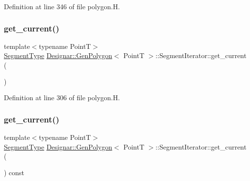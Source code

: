 Definition at line 346 of file polygon.\+H.

\mbox{\label{class_designar_1_1_gen_polygon_1_1_segment_iterator_ac70a85f86d2ff0b55b3bfe1a495afcc3}} 
\subsubsection{\texorpdfstring{get\+\_\+current()}{get\_current()}\hspace{0.1cm}{\footnotesize\ttfamily [1/2]}}
{\footnotesize\ttfamily template$<$typename PointT$>$ \\
\hyperlink{class_designar_1_1_gen_polygon_a06fe54118b31269c3fc76cc9b5e55654}{Segment\+Type} \hyperlink{class_designar_1_1_gen_polygon}{Designar\+::\+Gen\+Polygon}$<$ PointT $>$\+::Segment\+Iterator\+::get\+\_\+current (\begin{DoxyParamCaption}{ }\end{DoxyParamCaption})\hspace{0.3cm}{\ttfamily [inline]}}



Definition at line 306 of file polygon.\+H.

\mbox{\label{class_designar_1_1_gen_polygon_1_1_segment_iterator_ad899db34f5eb391c6ad361e7eb7b889c}} 
\subsubsection{\texorpdfstring{get\+\_\+current()}{get\_current()}\hspace{0.1cm}{\footnotesize\ttfamily [2/2]}}
{\footnotesize\ttfamily template$<$typename PointT$>$ \\
\hyperlink{class_designar_1_1_gen_polygon_a06fe54118b31269c3fc76cc9b5e55654}{Segment\+Type} \hyperlink{class_designar_1_1_gen_polygon}{Designar\+::\+Gen\+Polygon}$<$ PointT $>$\+::Segment\+Iterator\+::get\+\_\+current (\begin{DoxyParamCaption}{ }\end{DoxyParamCaption}) const\hspace{0.3cm}{\ttfamily [inline]}}



